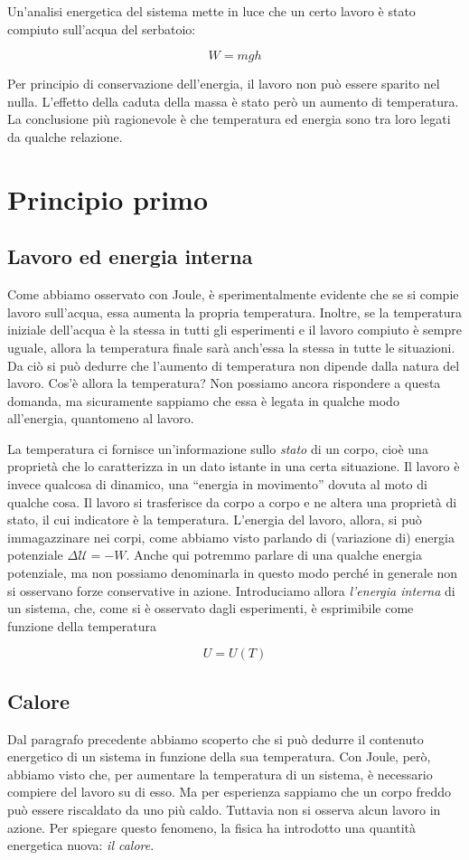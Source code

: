 Un'analisi energetica del sistema mette in luce che un certo lavoro è
stato compiuto sull'acqua del serbatoio:

\[ W = mgh \]

\noindent Per principio di conservazione dell'energia, il lavoro non
può essere sparito nel nulla. L'effetto della caduta della massa è stato però un aumento di temperatura.
La conclusione più ragionevole è che temperatura ed energia sono tra
loro legati da qualche relazione.




\section{Principio primo}

\subsection{Lavoro ed energia interna}
Come abbiamo osservato con Joule, è sperimentalmente evidente che
se si compie lavoro sull'acqua, essa
aumenta la propria temperatura. Inoltre, se la temperatura iniziale
dell'acqua è la stessa in tutti gli esperimenti e il lavoro compiuto
è sempre uguale, allora la temperatura finale sarà anch'essa la stessa
in tutte le situazioni. Da ciò si può dedurre che l'aumento di
temperatura non dipende dalla natura del lavoro. Cos'è allora la
temperatura? Non possiamo ancora rispondere a questa domanda, ma
sicuramente sappiamo che essa è legata in qualche modo all'energia,
quantomeno al lavoro.

La temperatura ci fornisce un'informazione sullo \textit{stato} di
un corpo, cioè una proprietà che lo caratterizza in un dato istante
in una certa situazione. Il lavoro è invece qualcosa di dinamico,
una ``energia in movimento'' dovuta al moto di qualche cosa. Il
lavoro si trasferisce da corpo a corpo e ne altera una proprietà di
stato, il cui indicatore è la temperatura. L'energia del lavoro,
allora, si può immagazzinare nei corpi, come abbiamo visto parlando
di (variazione di) energia potenziale $\Delta\mathcal{U} = -W$.
Anche qui potremmo parlare di una qualche energia potenziale, ma
non possiamo denominarla in questo modo perché in generale non
si osservano forze conservative in azione. Introduciamo allora
\textit{l'energia interna} di un sistema, che, come si è osservato
dagli esperimenti, è esprimibile come funzione della temperatura

\[ U = U(T) \]

\subsection{Calore}
Dal paragrafo precedente abbiamo scoperto che si può dedurre il
contenuto energetico di un sistema in funzione della sua temperatura.
Con Joule, però, abbiamo visto che, per aumentare la temperatura di
un sistema, è necessario compiere del lavoro su di esso. Ma per
esperienza sappiamo che un corpo freddo può essere riscaldato da uno
più caldo. Tuttavia non si osserva alcun lavoro in azione. Per
spiegare questo fenomeno, la fisica ha introdotto una quantità
energetica nuova: \textit{il calore}.

